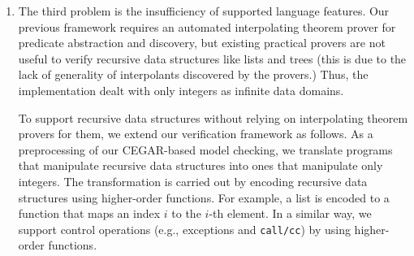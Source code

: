 \begin{enumerate}
%


%
%

\item The third problem is the insufficiency of supported language
      features.  Our previous framework requires an automated
      interpolating theorem prover for predicate abstraction and
      discovery, but existing practical provers are not useful to verify
      recursive data structures like lists and trees (this is due to
      the lack of generality of interpolants discovered by the provers.)
      Thus, the implementation dealt with only integers as infinite data
      domains.

      To support recursive data structures without relying on
      interpolating theorem provers for them, we extend our verification
      framework as follows.  As a preprocessing of our CEGAR-based model
      checking, we translate programs that manipulate recursive data
      structures into ones that manipulate only integers.  The
      transformation is carried out by encoding recursive data
      structures using higher-order functions.  For example, a list is
      encoded to a function that maps an index $i$ to the $i$-th
      element.  In a similar way, we support control operations (e.g.,
      exceptions and \texttt{call/cc}) by using higher-order functions.
\end{enumerate}

